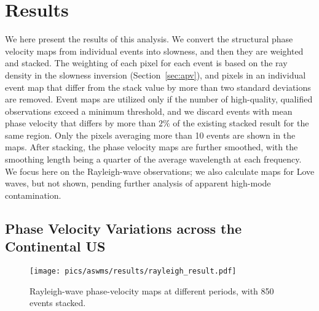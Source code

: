 
\section{Results}

We here present the results of this analysis. We convert the structural phase velocity maps from individual events into slowness, and then they are weighted and stacked. 
The weighting of each pixel for each event is based on the ray density in the slowness inversion (Section~\ref{sec:apv}), and pixels in an individual event map that differ from the stack value by more than two standard deviations are removed. Event maps are utilized only if the number of high-quality, qualified observations exceed a minimum threshold, and we discard events with mean phase velocity that differs by more than $2\%$ of the existing stacked result for the same region.
Only the pixels averaging more than 10 events are shown in the maps. After stacking, the phase velocity maps are further smoothed, with the smoothing length being a quarter of the average wavelength at each frequency. We focus here on the Rayleigh-wave observations; we also calculate maps for Love waves, but not shown, pending further analysis of apparent high-mode contamination.

\subsection{Phase Velocity Variations across the Continental US}



\begin{figure}
	\center
	\texttt{[image: pics/aswms/results/rayleigh\_result.pdf]}
	\caption{Rayleigh-wave phase-velocity maps at different periods, with 850 events stacked.}
	\label{fig:rayleigh_result}
\end{figure}

